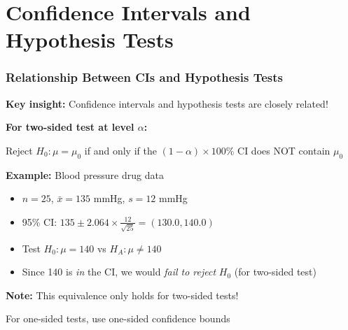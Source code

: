 \documentclass{beamer}
\begin{document}
\section{Confidence Intervals and Hypothesis Tests}

\begin{frame}
\frametitle{Relationship Between CIs and Hypothesis Tests}
\textbf{Key insight:} Confidence intervals and hypothesis tests are closely related!

\vspace{0.5cm}
\textbf{For two-sided test at level $\alpha$:}

\vspace{0.3cm}
Reject $H_0: \mu = \mu_0$ if and only if the $(1-\alpha) \times 100$\% CI does NOT contain $\mu_0$

\vspace{0.5cm}
\textbf{Example:} Blood pressure drug data
\begin{itemize}
\item $n = 25$, $\bar{x} = 135$ mmHg, $s = 12$ mmHg
\item 95\% CI: $135 \pm 2.064 \times \frac{12}{\sqrt{25}} = (130.0, 140.0)$
\item Test $H_0: \mu = 140$ vs $H_A: \mu \neq 140$
\item Since 140 is \textit{in} the CI, we would \textit{fail to reject} $H_0$ (for two-sided test)
\end{itemize}

\vspace{0.3cm}
\textbf{Note:} This equivalence only holds for two-sided tests!

\vspace{0.3cm}
For one-sided tests, use one-sided confidence bounds
\end{frame}
\end{document}
